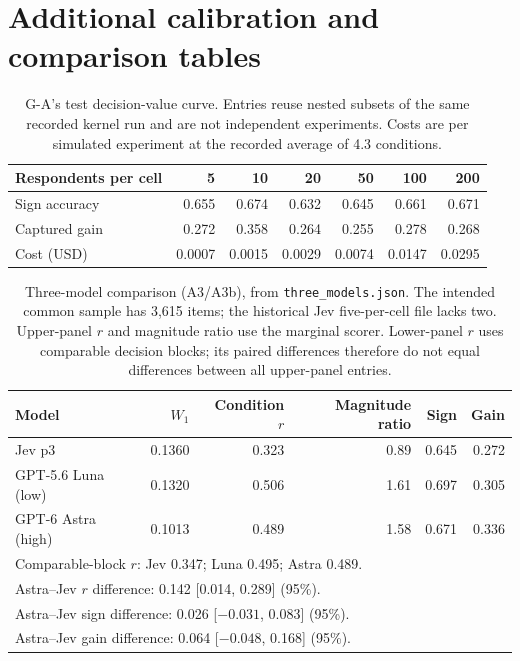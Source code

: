 \documentclass[11pt]{article}
\begin{document}
\section{Additional calibration and comparison tables}\label{app:extra}
\begin{table}[!htbp]
\centering\small
\caption{G-A's test decision-value curve. Entries reuse nested subsets of the same recorded kernel run and are not independent experiments. Costs are per simulated experiment at the recorded average of 4.3 conditions.}
\begin{tabular}{lrrrrrr}
\toprule
Respondents per cell & 5 & 10 & 20 & 50 & 100 & 200\\
\midrule
Sign accuracy & 0.655 & 0.674 & 0.632 & 0.645 & 0.661 & 0.671\\
Captured gain & 0.272 & 0.358 & 0.264 & 0.255 & 0.278 & 0.268\\
Cost (USD) & 0.0007 & 0.0015 & 0.0029 & 0.0074 & 0.0147 & 0.0295\\
\bottomrule
\end{tabular}
\end{table}

\begin{table}[!htbp]
\centering\small
\caption{Three-model comparison (A3/A3b), from \texttt{three\_models.json}. The intended common sample has 3,615 items; the historical Jev five-per-cell file lacks two. Upper-panel $r$ and magnitude ratio use the marginal scorer. Lower-panel $r$ uses comparable decision blocks; its paired differences therefore do not equal differences between all upper-panel entries.}
\label{app:models}
\begin{tabular}{lrrrrr}
\toprule
Model & $W_1$ & Condition $r$ & Magnitude ratio & Sign & Gain\\
\midrule
Jev p3 & 0.1360 & 0.323 & 0.89 & 0.645 & 0.272\\
GPT-5.6 Luna (low) & 0.1320 & 0.506 & 1.61 & 0.697 & 0.305\\
GPT-6 Astra (high) & 0.1013 & 0.489 & 1.58 & 0.671 & 0.336\\
\midrule
\multicolumn{6}{l}{Comparable-block $r$: Jev 0.347; Luna 0.495; Astra 0.489.}\\
\multicolumn{6}{l}{Astra--Jev $r$ difference: 0.142 [0.014, 0.289] (95\%).}\\
\multicolumn{6}{l}{Astra--Jev sign difference: 0.026 [$-0.031$, 0.083] (95\%).}\\
\multicolumn{6}{l}{Astra--Jev gain difference: 0.064 [$-0.048$, 0.168] (95\%).}\\
\bottomrule
\end{tabular}
\end{table}
\end{document}

